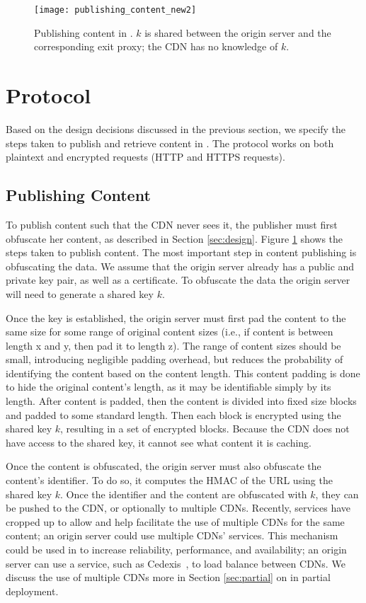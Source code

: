 \begin{figure}[t!]
\centering
\texttt{[image: publishing\_content\_new2]}
\caption{Publishing content in \system{}.  $k$ is shared between the 
origin server and the corresponding exit proxy; the CDN has no knowledge of $k$.}
\label{fig:publishing}
\end{figure}

\section{\system{} Protocol}
\label{sec:protocol}
Based on the design decisions discussed in the previous section, we specify the 
steps taken to publish and retrieve content in \system{}. The \system{} protocol works 
on both plaintext and encrypted requests (HTTP and HTTPS requests).

\subsection{Publishing Content}
\label{sec:publish_protocol}
To publish content such that the CDN never sees it, the publisher 
must first obfuscate her content, as described in Section \ref{sec:design}. 
Figure \ref{fig:publishing} shows the steps taken to publish content. The most important step in content publishing is obfuscating the data.  We assume that the origin server already has a public and private key pair, as well as a certificate.  To obfuscate the data the origin server will need to generate a shared key $k$. 

Once the key is established, the origin server must first pad the content to the same size for some 
range of original content sizes (i.e., if content is between length x and y, then pad it to length 
z).  The range of content sizes should be small, introducing negligible padding
overhead, but
reduces the probability of identifying the content based on the content length.  This content padding 
is done to hide the original content's length, as it may be identifiable simply by its length.  After 
content is padded, then the content is divided into fixed size blocks and padded to 
some standard length.  Then each block is encrypted using the shared key $k$, 
resulting in a set of encrypted blocks. Because the CDN does not have access to the shared key, 
it cannot see what content it is caching.  

Once the content is obfuscated, the origin server must also obfuscate the content's identifier.  To do so, 
it computes the HMAC of the URL using the shared key $k$.
Once the identifier and the content are obfuscated with $k$, they can be pushed to the CDN, or optionally to multiple 
CDNs.  Recently, services have cropped up to allow and help facilitate the use of multiple CDNs for the same content; an 
origin server could use multiple CDNs' services.  This mechanism could be used in \system{} to increase reliability, 
performance, and availability; an origin server can use a service, such as Cedexis~\cite{cedexis}, to load balance between 
CDNs.  We discuss the use of multiple CDNs more in Section \ref{sec:partial} on \system{} in 
partial deployment.

